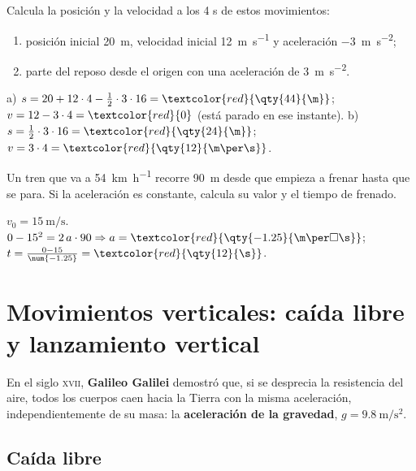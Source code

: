 \begin{exercise}
    Calcula la posición y la velocidad a los 4 s de estos movimientos:
    \begin{enumerate}[label=\alph*)]
        \item posición inicial \qty{20}{\m}, velocidad inicial \qty{12}{\m\per\s} y aceleración \qty{-3}{\m\per\square\s};
        \item parte del reposo desde el origen con una aceleración de \qty{3}{\m\per\square\s}.
    \end{enumerate}
    \begin{solu}
        a) \(s = 20 + 12 \cdot 4 - \frac{1}{2} \cdot 3 \cdot 16 = \textcolor{red}{\qty{44}{\m}}\); \(v = 12 - 3 \cdot 4 = \textcolor{red}{0}\) (está parado en ese instante).
        b) \(s = \frac{1}{2} \cdot 3 \cdot 16 = \textcolor{red}{\qty{24}{\m}}\); \(v = 3 \cdot 4 = \textcolor{red}{\qty{12}{\m\per\s}}\).
    \end{solu}
\end{exercise}

\begin{exercise}
    Un tren que va a \qty{54}{\km\per\hour} recorre \qty{90}{\m} desde que empieza a frenar hasta que se para. Si la aceleración es constante, calcula su valor y el tiempo de frenado.
    \begin{solu}
        \(v_0 = \qty{15}{\m\per\s}\). \(0 - 15^2 = 2\,a \cdot 90 \Rightarrow a = \textcolor{red}{\qty{-1.25}{\m\per\square\s}}\); \(t = \frac{0 - 15}{\num{-1.25}} = \textcolor{red}{\qty{12}{\s}}\).
    \end{solu}
\end{exercise}

\section{Movimientos verticales: caída libre y lanzamiento vertical}

En el siglo \textsc{xvii}, \textbf{Galileo Galilei} demostró que, si se desprecia la resistencia del aire, todos los cuerpos caen hacia la Tierra con la misma aceleración, independientemente de su masa: la \textbf{aceleración de la gravedad}, \(g = \qty{9.8}{\m\per\square\s}\).

\subsection{Caída libre}

